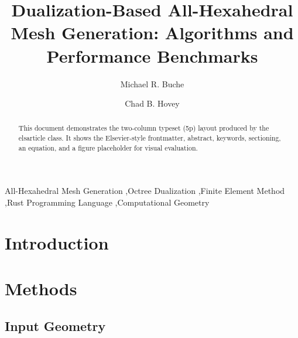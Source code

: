 \documentclass[review,12pt]{elsarticle}
\begin{document}
\begin{frontmatter}
\linenumbers

\title{Dualization-Based All-Hexahedral Mesh Generation: Algorithms and Performance Benchmarks}

\author{Michael R. Buche}
\author{Chad B. Hovey}

\begin{abstract}
This document demonstrates the two-column typeset (5p) layout produced by the
elsarticle class. It shows the Elsevier-style frontmatter, abstract, keywords,
sectioning, an equation, and a figure placeholder for visual evaluation.
\end{abstract}


\begin{keyword}
All-Hexahedral Mesh Generation \sep Octree Dualization \sep Finite Element Method \sep Rust Programming Language \sep Computational Geometry
\end{keyword}

\end{frontmatter}

\tableofcontents

\linenumbers

\section{Introduction}
\label{sec:intro}

\section{Methods}

\subsection{Input Geometry}
\end{document}
